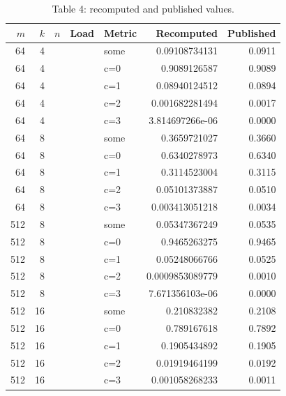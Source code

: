 \begin{longtable}{rrrllrr}
\caption{Table 4: recomputed and published values.}\\
$m$ & $k$ & $n$ & Load & Metric & Recomputed & Published \\
\hline
64 & 4 &  &  & some & 0.09108734131 & 0.0911 \\
64 & 4 &  &  & c=0 & 0.9089126587 & 0.9089 \\
64 & 4 &  &  & c=1 & 0.08940124512 & 0.0894 \\
64 & 4 &  &  & c=2 & 0.001682281494 & 0.0017 \\
64 & 4 &  &  & c=3 & 3.814697266e-06 & 0.0000 \\
64 & 8 &  &  & some & 0.3659721027 & 0.3660 \\
64 & 8 &  &  & c=0 & 0.6340278973 & 0.6340 \\
64 & 8 &  &  & c=1 & 0.3114523004 & 0.3115 \\
64 & 8 &  &  & c=2 & 0.05101373887 & 0.0510 \\
64 & 8 &  &  & c=3 & 0.003413051218 & 0.0034 \\
512 & 8 &  &  & some & 0.05347367249 & 0.0535 \\
512 & 8 &  &  & c=0 & 0.9465263275 & 0.9465 \\
512 & 8 &  &  & c=1 & 0.05248066766 & 0.0525 \\
512 & 8 &  &  & c=2 & 0.0009853089779 & 0.0010 \\
512 & 8 &  &  & c=3 & 7.671356103e-06 & 0.0000 \\
512 & 16 &  &  & some & 0.210832382 & 0.2108 \\
512 & 16 &  &  & c=0 & 0.789167618 & 0.7892 \\
512 & 16 &  &  & c=1 & 0.1905434892 & 0.1905 \\
512 & 16 &  &  & c=2 & 0.01919464199 & 0.0192 \\
512 & 16 &  &  & c=3 & 0.001058268233 & 0.0011 \\
\end{longtable}
